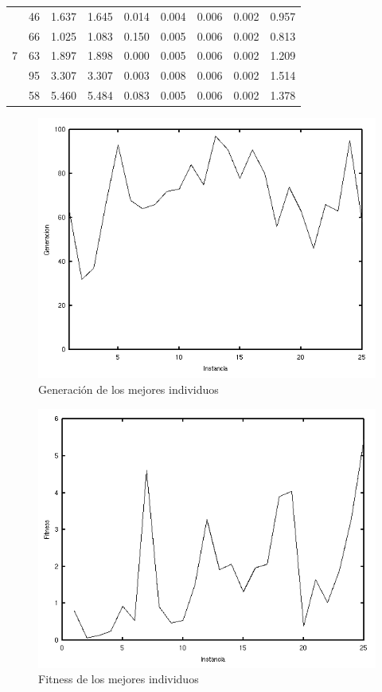 \documentclass[journal]{IEEEtran}
\begin{document}
\begin{table}[h]
\begin{tabular}{|c|c|c|c|c|c|c|c|c|}
\multirow{5}{*}{7} & 46 & 1.637 & 1.645 & 0.014 & 0.004 & 0.006 & 0.002 & 0.957 \\
                   & 66 & 1.025 & 1.083 & 0.150 & 0.005 & 0.006 & 0.002 & 0.813 \\
                   & 63 & 1.897 & 1.898 & 0.000 & 0.005 & 0.006 & 0.002 & 1.209 \\
                   & 95 & 3.307 & 3.307 & 0.003 & 0.008 & 0.006 & 0.002 & 1.514 \\
                   & 58 & 5.460 & 5.484 & 0.083 & 0.005 & 0.006 & 0.002 & 1.378 \\  \hline

\end{tabular}

\label{tab:evaluation}
\end{table}

\begin{figure}[h]
\centering
\includegraphics[width=\linewidth]{generations.png}
\caption{Generación de los mejores individuos}
\label{fig:generations}
\end{figure}

\begin{figure}[h]
\centering
\includegraphics[width=\linewidth]{fitness.png}
\caption{Fitness de los mejores individuos}
\label{fig:fitness}
\end{figure}
\end{document}
